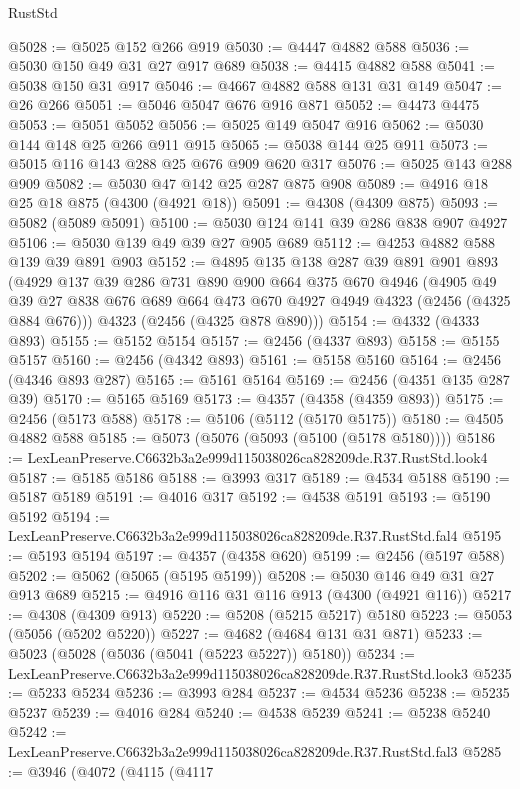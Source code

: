 \begin{lexlean}{RustStd}
\begin{coremodule}
@5028 := @5025 @152 @266 @919
@5030 := @4447 @4882 @588
@5036 := @5030 @150 @49 @31 @27 @917 @689
@5038 := @4415 @4882 @588
@5041 := @5038 @150 @31 @917
@5046 := @4667 @4882 @588 @131 @31 @149
@5047 := @26 @266
@5051 := @5046 @5047 @676 @916 @871
@5052 := @4473 @4475
@5053 := @5051 @5052
@5056 := @5025 @149 @5047 @916
@5062 := @5030 @144 @148 @25 @266 @911 @915
@5065 := @5038 @144 @25 @911
@5073 := @5015 @116 @143 @288 @25 @676 @909 @620 @317
@5076 := @5025 @143 @288 @909
@5082 := @5030 @47 @142 @25 @287 @875 @908
@5089 := @4916 @18 @25 @18 @875 (@4300 (@4921 @18))
@5091 := @4308 (@4309 @875)
@5093 := @5082 (@5089 @5091)
@5100 := @5030 @124 @141 @39 @286 @838 @907 @4927
@5106 := @5030 @139 @49 @39 @27 @905 @689
@5112 := @4253 @4882 @588 @139 @39 @891 @903
@5152 := @4895
    @135
    @138
    @287
    @39
    @891
    @901
    @893
    (@4929
      @137
      @39
      @286
      @731
      @890
      @900
      @664
      @375
      @670
      @4946
      (@4905 @49 @39 @27 @838 @676 @689 @664 @473 @670 @4927 @4949 @4323 (@2456 (@4325 @884 @676)))
      @4323
      (@2456 (@4325 @878 @890)))
@5154 := @4332 (@4333 @893)
@5155 := @5152 @5154
@5157 := @2456 (@4337 @893)
@5158 := @5155 @5157
@5160 := @2456 (@4342 @893)
@5161 := @5158 @5160
@5164 := @2456 (@4346 @893 @287)
@5165 := @5161 @5164
@5169 := @2456 (@4351 @135 @287 @39)
@5170 := @5165 @5169
@5173 := @4357 (@4358 (@4359 @893))
@5175 := @2456 (@5173 @588)
@5178 := @5106 (@5112 (@5170 @5175))
@5180 := @4505 @4882 @588
@5185 := @5073 (@5076 (@5093 (@5100 (@5178 @5180))))
@5186 := LexLeanPreserve.C6632b3a2e999d115038026ca828209de.R37.RustStd.look4
@5187 := @5185 @5186
@5188 := @3993 @317
@5189 := @4534 @5188
@5190 := @5187 @5189
@5191 := @4016 @317
@5192 := @4538 @5191
@5193 := @5190 @5192
@5194 := LexLeanPreserve.C6632b3a2e999d115038026ca828209de.R37.RustStd.fal4
@5195 := @5193 @5194
@5197 := @4357 (@4358 @620)
@5199 := @2456 (@5197 @588)
@5202 := @5062 (@5065 (@5195 @5199))
@5208 := @5030 @146 @49 @31 @27 @913 @689
@5215 := @4916 @116 @31 @116 @913 (@4300 (@4921 @116))
@5217 := @4308 (@4309 @913)
@5220 := @5208 (@5215 @5217) @5180
@5223 := @5053 (@5056 (@5202 @5220))
@5227 := @4682 (@4684 @131 @31 @871)
@5233 := @5023 (@5028 (@5036 (@5041 (@5223 @5227)) @5180))
@5234 := LexLeanPreserve.C6632b3a2e999d115038026ca828209de.R37.RustStd.look3
@5235 := @5233 @5234
@5236 := @3993 @284
@5237 := @4534 @5236
@5238 := @5235 @5237
@5239 := @4016 @284
@5240 := @4538 @5239
@5241 := @5238 @5240
@5242 := LexLeanPreserve.C6632b3a2e999d115038026ca828209de.R37.RustStd.fal3
@5285 := @3946
    (@4072
      (@4115
        (@4117

\end{coremodule}
\end{lexlean}
